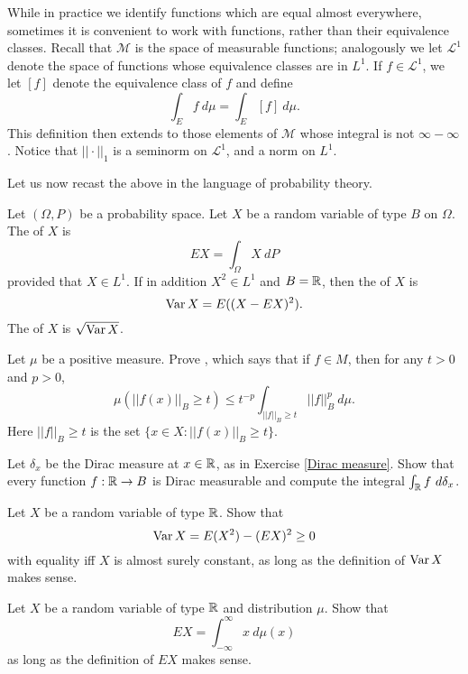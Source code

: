 \begin{subsec}
While in practice we identify functions which are equal almost everywhere, sometimes it is convenient to work with functions, rather than their equivalence classes.
Recall that $\mathcal M$ is the space of measurable functions; analogously we let $\mathcal L^1$ denote the space of functions whose equivalence classes are in $L^1$. If $f \in \mathcal L^1$, we let $[f]$ denote the equivalence class of $f$ and define
\[\int_{E} f ~d\mu = \int_{E} [f]~d\mu.\]
This definition then extends to those elements of $\mathcal M$ whose integral is not $\infty - \infty$.
Notice that $||\cdot||_1$ is a seminorm on $\mathcal L^1$, and a norm on $L^1$.
\end{subsec}

\begin{subsec}
Let us now recast the above in the language of probability theory.
\end{subsec}

\begin{definition}
Let $(\Omega, P)$ be a probability space.
Let $X$ be a random variable of type $B$ on $\Omega$.
The  of $X$ is
\[EX = \int_{\Omega} X~dP\]
provided that $X \in L^1$.
If in addition $X^2 \in L^1$ and $B = \mathbb{R}$, then the  of $X$ is
\[\operatorname{Var} X = E((X - EX)^2).\]
The  of $X$ is $\sqrt{\operatorname{Var} X}$.
\end{definition}

\begin{exercise}
\label{Chebyshev}
Let $\mu$ be a positive measure.
Prove , which says that if $f \in M$, then for any $t > 0$ and $p > 0$,
\[\mu(||f(x)||_{B} \geq t) \leq t^{-p} \int_{||f||_{B} \geq t} ||f||_B^p~d\mu.\]
Here $||f||_{B} \geq t$ is the set $\{x \in X: ||f(x)||_{B} \geq t\}$.
\end{exercise}

\begin{exercise}
Let $\delta_x$ be the Dirac measure at $x \in \mathbb{R}$, as in Exercise \ref{Dirac measure}.
Show that every function $f: \mathbb{R} \to B$ is Dirac measurable and compute the integral $\int_{\mathbb{R}} f~d\delta_x$.
\end{exercise}

\begin{exercise}
Let $X$ be a random variable of type $\mathbb{R}$. Show that
\[\operatorname{Var} X = E(X^2) - (EX)^2 \geq 0\]
with equality iff $X$ is almost surely constant, as long as the definition of $\operatorname{Var} X$ makes sense.
\end{exercise}

\begin{exercise}
\label{integrating a distribution}
Let $X$ be a random variable of type $\mathbb{R}$ and distribution $\mu$. Show that
\[EX = \int_{-\infty}^{\infty} x ~d\mu(x)\]
as long as the definition of $EX$ makes sense.
\end{exercise}
